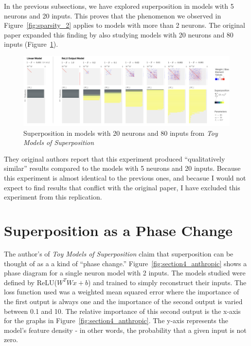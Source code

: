 \documentclass{article} %
\begin{document}
In the previous subsections, we have explored superposition in models with 5
neurons and 20 inputs. This proves that the phenomenon we observed in Figure~\ref{fig:sparsity_2}
applies to models with more than 2 neurons. The original paper expanded this 
finding by also studying models with 20 neurons and 80 inputs (Figure~\ref{fig:section3_anthropic2}). \\

\begin{figure}[h]
    \centering
    \includegraphics[width=0.99\linewidth]{demonstrating_superposition/images/anthropic_section3_part2.png}
    \captionsetup{font=footnotesize, width=0.7\linewidth} %
    \caption{
        Superposition in models with 20 neurons and 80 inputs from \textit{Toy Models of Superposition}\cite{elhage2022toy}
    }
    \label{fig:section3_anthropic2}
\end{figure}

They original authors report that this experiment produced ``qualitatively similar''
results compared to the models with 5 neurons and 20 inputs. Because this experiment 
is almost identical to the previous ones, and becasue I would not expect to find 
results that conflict with the original paper, I have excluded this experiment 
from this replication. \\

\section{Superposition as a Phase Change}

The author's of \textit{Toy Models of Superposition} claim that superposition
can be thought of as a a kind of ``phase change.'' Figure~\ref{fig:section4_anthropic}
shows a phase diagram for a single neuron model with 2 inputs. The models studied were
defined by ReLU($W^TWx + b$) and trained to simply reconstruct their inputs. The loss 
function used was a weighted mean squared error where the 
importance of the first output is always one and the importance of 
the second output is varied between 0.1 and 10. The relative importance of this
second output is the x-axis for the graphs in Figure~\ref{fig:section4_anthropic}.
The y-axis represents the model's feature density - in other words, the probability
that a given input is not zero.
\end{document}

